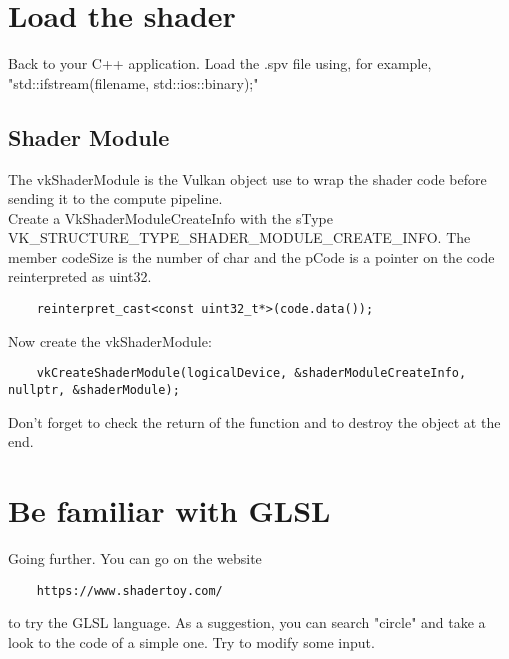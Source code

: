 \documentclass{article}
\begin{document}
\section{Load the shader}
Back to your C++ application. Load the .spv file using, for example, "std::ifstream(filename, std::ios::binary);"

\subsection{Shader Module}
The vkShaderModule is the Vulkan object use to wrap the shader code before sending it to the compute pipeline.\\
Create a VkShaderModuleCreateInfo with the sType VK\_STRUCTURE\_TYPE\_SHADER\_MODULE\_CREATE\_INFO. The member codeSize is the number of char and the pCode is a pointer on the code reinterpreted as uint32.

\begin{lstlisting}
	reinterpret_cast<const uint32_t*>(code.data());
\end{lstlisting}

Now create the vkShaderModule:

\begin{lstlisting}
	vkCreateShaderModule(logicalDevice, &shaderModuleCreateInfo, nullptr, &shaderModule);
\end{lstlisting}

Don't forget to check the return of the function and to destroy the object at the end.

\section{Be familiar with GLSL}
Going further.
You can go on the website 
\begin{lstlisting}
	https://www.shadertoy.com/
\end{lstlisting}
to try the GLSL language. As a suggestion, you can search "circle" and take a look to the code of a simple one. Try to modify some input. 
\end{document}
